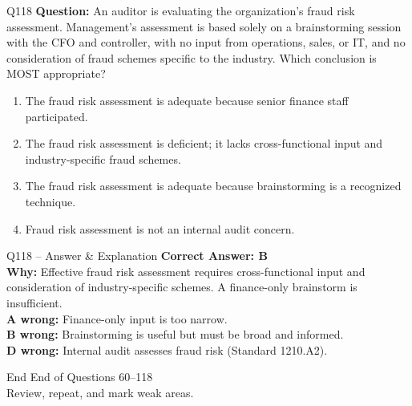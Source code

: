 \documentclass[aspectratio=169,10pt]{beamer}
\begin{document}
\begin{frame}[t]{Q118}
	\small
	\textbf{Question:} An auditor is evaluating the organization's fraud risk assessment. Management's assessment is based solely on a brainstorming session with the CFO and controller, with no input from operations, sales, or IT, and no consideration of fraud schemes specific to the industry. Which conclusion is MOST appropriate?
	\begin{enumerate}[label=\Alph*.,itemsep=1pt,topsep=2pt]
		\item The fraud risk assessment is adequate because senior finance staff participated.
		\item The fraud risk assessment is deficient; it lacks cross-functional input and industry-specific fraud schemes.
		\item The fraud risk assessment is adequate because brainstorming is a recognized technique.
		\item Fraud risk assessment is not an internal audit concern.
	\end{enumerate}
\end{frame}

\begin{frame}[t]{Q118 -- Answer \& Explanation}
	\small
	\textbf{Correct Answer: B} \\[4pt]
	\textbf{Why:} Effective fraud risk assessment requires cross-functional input and consideration of industry-specific schemes. A finance-only brainstorm is insufficient. \\[4pt]
	\textbf{A wrong:} Finance-only input is too narrow. \\[2pt]
	\textbf{B wrong:} Brainstorming is useful but must be broad and informed. \\[2pt]
	\textbf{D wrong:} Internal audit assesses fraud risk (Standard 1210.A2).
\end{frame}

\begin{frame}{End}
	\centering
	\Large End of Questions 60--118\\[8pt]
	\normalsize Review, repeat, and mark weak areas.
\end{frame}
	
\end{document}
